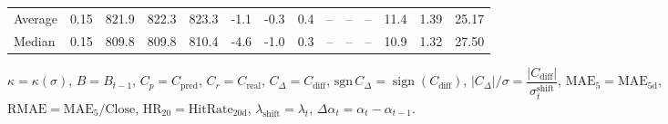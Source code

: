 \begin{threeparttable}
{\begin{tabular}{lrrrrrrrrrrrrr}
Average &     0.15 & 821.9 & 822.3 & 823.3 &       -1.1 &                     -0.3 &                 0.4 &         -- &        -- &             -- &             11.4 &            1.39 &                  25.17 \\
 Median &     0.15 & 809.8 & 809.8 & 810.4 &       -4.6 &                     -1.0 &                 0.3 &         -- &        -- &             -- &             10.9 &            1.32 &                  27.50 \\
\bottomrule
\end{tabular}
}
\begin{tablenotes}\footnotesize
\item $\kappa=\kappa(\sigma)$, $B=B_{t-1}$, $C_p=C_{\text{pred}}$, $C_r=C_{\text{real}}$, $C_\Delta=C_{\text{diff}}$, $\mathrm{sgn}\,C_\Delta=\operatorname{sign}(C_{\text{diff}})$, $|C_\Delta|/\sigma=\dfrac{|C_{\text{diff}}|}{\sigma_t^{\text{shift}}}$, $\mathrm{MAE}_5=\mathrm{MAE}_{5\text{d}}$, $\mathrm{RMAE}= \mathrm{MAE}_5 / \text{Close}$, $\mathrm{HR}_{20}=\mathrm{HitRate}_{20\text{d}}$, 
$\lambda_{\text{shift}}=\lambda_t$, 
$\Delta\alpha_t=\alpha_t-\alpha_{t-1}$.
\end{tablenotes}
\end{threeparttable}
\endgroup

